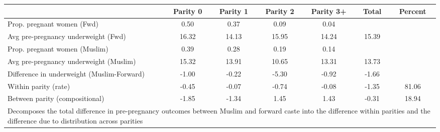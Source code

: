 \begin{tabular}{l*{6}{c}}
\toprule
            &\multicolumn{1}{c}{Parity 0}&\multicolumn{1}{c}{Parity 1}&\multicolumn{1}{c}{Parity 2}&\multicolumn{1}{c}{Parity 3+}&\multicolumn{1}{c}{Total}&\multicolumn{1}{c}{Percent}\\
\midrule
\midrule
Prop. pregnant women (Fwd)&        0.50&        0.37&        0.09&        0.04&            &            \\
Avg pre-pregnancy underweight (Fwd)&       16.32&       14.13&       15.95&       14.24&       15.39&            \\
Prop. pregnant women (Muslim)&        0.39&        0.28&        0.19&        0.14&            &            \\
Avg pre-pregnancy underweight (Muslim)&       15.32&       13.91&       10.65&       13.31&       13.73&            \\
Difference in underweight (Muslim-Forward)&       -1.00&       -0.22&       -5.30&       -0.92&       -1.66&            \\
Within parity (rate)&       -0.45&       -0.07&       -0.74&       -0.08&       -1.35&       81.06\\
Between parity (compositional)&       -1.85&       -1.34&        1.45&        1.43&       -0.31&       18.94\\
\bottomrule
\multicolumn{7}{l}{\footnotesize Decomposes the total difference in pre-pregnancy outcomes between Muslim and forward caste into the difference within parities and the difference due to distribution across parities}\\
\end{tabular}
